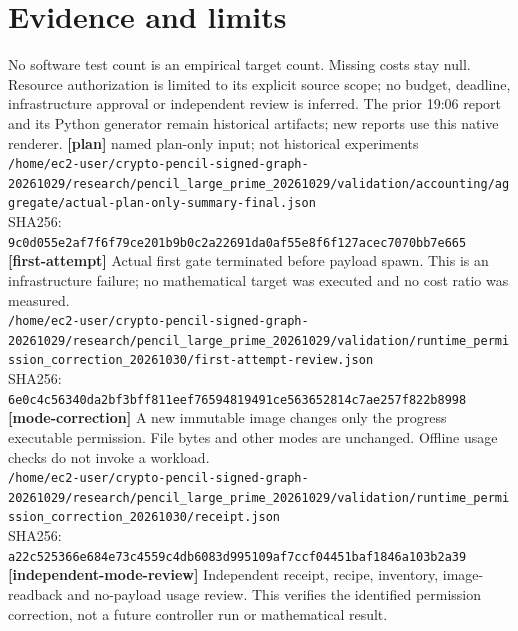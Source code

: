 \documentclass[11pt]{article}
\begin{document}
\section*{Evidence and limits}
No software test count is an empirical target count. Missing costs stay null. Resource authorization is limited to its explicit source scope; no budget, deadline, infrastructure approval or independent review is inferred. The prior 19:06 report and its Python generator remain historical artifacts; new reports use this native renderer.
\small
\textbf{[plan]} named plan-only input; not historical experiments\\
\texttt{/\allowbreak{}home/\allowbreak{}ec2-user/\allowbreak{}crypto-pencil-signed-graph-20261029/\allowbreak{}research/\allowbreak{}pencil\_large\_prime\_20261029/\allowbreak{}validation/\allowbreak{}accounting/\allowbreak{}aggregate/\allowbreak{}actual-plan-only-summary-final.json}\\
SHA256: \texttt{9c0d055e2af7f6f79ce201b9b0c2a22691da0af55e8f6f127acec7070bb7e665}\\
\textbf{[first-attempt]} Actual first gate terminated before payload spawn. This is an infrastructure failure; no mathematical target was executed and no cost ratio was measured.\\
\texttt{/\allowbreak{}home/\allowbreak{}ec2-user/\allowbreak{}crypto-pencil-signed-graph-20261029/\allowbreak{}research/\allowbreak{}pencil\_large\_prime\_20261029/\allowbreak{}validation/\allowbreak{}runtime\_permission\_correction\_20261030/\allowbreak{}first-attempt-review.json}\\
SHA256: \texttt{6e0c4c56340da2bf3bff811eef76594819491ce563652814c7ae257f822b8998}\\
\textbf{[mode-correction]} A new immutable image changes only the progress executable permission. File bytes and other modes are unchanged. Offline usage checks do not invoke a workload.\\
\texttt{/\allowbreak{}home/\allowbreak{}ec2-user/\allowbreak{}crypto-pencil-signed-graph-20261029/\allowbreak{}research/\allowbreak{}pencil\_large\_prime\_20261029/\allowbreak{}validation/\allowbreak{}runtime\_permission\_correction\_20261030/\allowbreak{}receipt.json}\\
SHA256: \texttt{a22c525366e684e73c4559c4db6083d995109af7ccf04451baf1846a103b2a39}\\
\textbf{[independent-mode-review]} Independent receipt, recipe, inventory, image-readback and no-payload usage review. This verifies the identified permission correction, not a future controller run or mathematical result.\\
\end{document}
